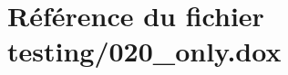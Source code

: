 \hypertarget{020__only_8dox}{}\section{Référence du fichier testing/020\+\_\+only.dox}
\label{020__only_8dox}
